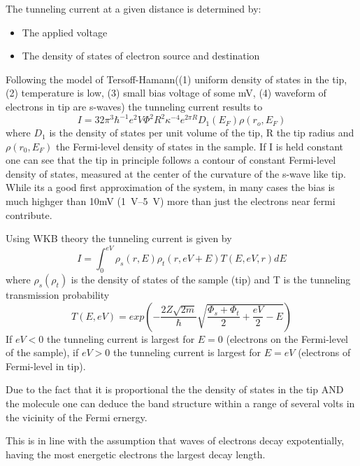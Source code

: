 The tunneling current at a given distance is determined by:
\begin{itemize}
 \item The applied voltage
 \item The density of states of electron source and destination
\end{itemize}

Following the model of  Tersoff-Hamann((1) uniform density of states in the tip, (2) temperature is low, (3) small bias voltage of some mV, (4) waveform of electrons in tip are s-waves) the tunneling current results to 
$$I=32\pi^3\hbar^{-1}e^2V\Phi^2 R^2\kappa^{-4}e^{2\pi R}D_1(E_F)\rho(r_o,E_F)$$ where $D_1$ is the density of states per unit volume of the tip, R the tip radius and $\rho(r_0,E_F)$ the Fermi-level density of states in the sample. If I is held constant one can see that the tip in principle follows a contour of constant Fermi-level density of states, measured at the center of the curvature of the s-wave like tip. While its a good first approximation of the system, in many cases the bias is much highger than 10mV (\SIrange{1}{5}{\V}) more than just the electrons near fermi contribute.

Using  WKB theory the tunneling current is given by
\begin{equation}
I=\int_0^{eV}\rho_s(r,E)\rho_t(r,eV+E)T(E,eV,r)dE
\label{WKB}
\end{equation}
where $\rho_s(\rho_t)$ is the density of states of the sample (tip) and T is the tunneling transmission probability
\begin{equation}
T(E,eV)=exp\left(-\frac{2Z\sqrt{2m}}{\hbar}\sqrt{\frac{\Phi_s+\Phi_t}{2}+\frac{eV}{2}-E}\right)
\label{Transmission-function} 
\end{equation}
If $eV<0$ the tunneling current is largest for $E=0$ (electrons on the Fermi-level of the sample), if $eV>0$ the tunneling current is largest for $E=eV$ (electrons of Fermi-level in tip).

Due to the fact that it is proportional the the density of states in the tip AND the molecule one can deduce the band structure within a range of several volts in the vicinity of the Fermi ernergy.

This is in line with the assumption that waves of electrons decay expotentially, having the most energetic electrons the largest decay length.